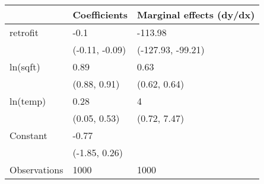 \begin{tabular}{lll}
\toprule
{} &    Coefficients & Marginal effects (dy/dx) \\
\midrule
retrofit     &            -0.1 &                  -113.98 \\
             &  (-0.11, -0.09) &        (-127.93, -99.21) \\
ln(sqft)     &            0.89 &                     0.63 \\
             &    (0.88, 0.91) &             (0.62, 0.64) \\
ln(temp)     &            0.28 &                        4 \\
             &    (0.05, 0.53) &             (0.72, 7.47) \\
Constant     &           -0.77 &                          \\
             &   (-1.85, 0.26) &                          \\
Observations &            1000 &                     1000 \\
\bottomrule
\end{tabular}
